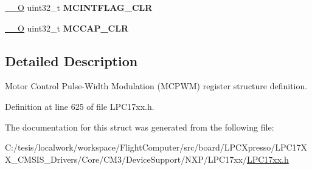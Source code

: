 \begin{DoxyCompactItemize}
\item 
\hypertarget{struct_l_p_c___m_c_p_w_m___type_def_a953788a544160d6b088acc0f33f1fccb}{\hyperlink{group___c_m_s_i_s__core__definitions_ga7e25d9380f9ef903923964322e71f2f6}{\-\_\-\-\_\-\-O} uint32\-\_\-t {\bfseries \-M\-C\-I\-N\-T\-F\-L\-A\-G\-\_\-\-C\-L\-R}}\label{struct_l_p_c___m_c_p_w_m___type_def_a953788a544160d6b088acc0f33f1fccb}

\item 
\hypertarget{struct_l_p_c___m_c_p_w_m___type_def_a8094300f14c294ffaa14db0c1a006582}{\hyperlink{group___c_m_s_i_s__core__definitions_ga7e25d9380f9ef903923964322e71f2f6}{\-\_\-\-\_\-\-O} uint32\-\_\-t {\bfseries \-M\-C\-C\-A\-P\-\_\-\-C\-L\-R}}\label{struct_l_p_c___m_c_p_w_m___type_def_a8094300f14c294ffaa14db0c1a006582}

\end{DoxyCompactItemize}


\subsection{\-Detailed \-Description}
\-Motor \-Control \-Pulse-\/\-Width \-Modulation (\-M\-C\-P\-W\-M) register structure definition. 

\-Definition at line 625 of file \-L\-P\-C17xx.\-h.



\-The documentation for this struct was generated from the following file\-:\begin{DoxyCompactItemize}
\item 
\-C\-:/tesis/localwork/workspace/\-Flight\-Computer/src/board/\-L\-P\-C\-Xpresso/\-L\-P\-C17\-X\-X\-\_\-\-C\-M\-S\-I\-S\-\_\-\-Drivers/\-Core/\-C\-M3/\-Device\-Support/\-N\-X\-P/\-L\-P\-C17xx/\hyperlink{_l_p_c17xx_8h}{\-L\-P\-C17xx.\-h}\end{DoxyCompactItemize}
